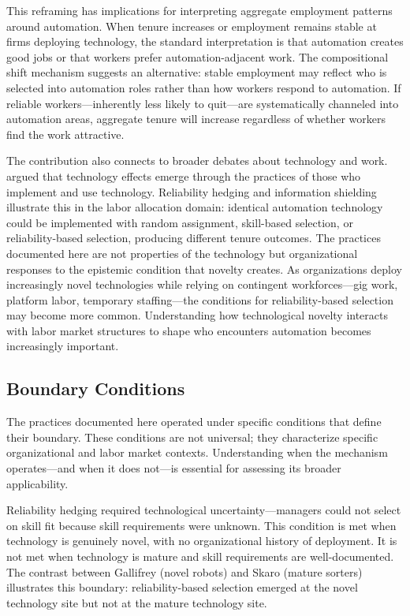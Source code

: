 \documentclass[12pt]{article}
\begin{document}
This reframing has implications for interpreting aggregate employment patterns around automation. When tenure increases or employment remains stable at firms deploying technology, the standard interpretation is that automation creates good jobs or that workers prefer automation-adjacent work. The compositional shift mechanism suggests an alternative: stable employment may reflect who is selected into automation roles rather than how workers respond to automation. If reliable workers---inherently less likely to quit---are systematically channeled into automation areas, aggregate tenure will increase regardless of whether workers find the work attractive.

The contribution also connects to broader debates about technology and work. \citet{orlikowski2000using} argued that technology effects emerge through the practices of those who implement and use technology. Reliability hedging and information shielding illustrate this in the labor allocation domain: identical automation technology could be implemented with random assignment, skill-based selection, or reliability-based selection, producing different tenure outcomes. The practices documented here are not properties of the technology but organizational responses to the epistemic condition that novelty creates. As organizations deploy increasingly novel technologies while relying on contingent workforces---gig work, platform labor, temporary staffing---the conditions for reliability-based selection may become more common. Understanding how technological novelty interacts with labor market structures to shape who encounters automation becomes increasingly important.

\subsection{Boundary Conditions}

The practices documented here operated under specific conditions that define their boundary. These conditions are not universal; they characterize specific organizational and labor market contexts. Understanding when the mechanism operates---and when it does not---is essential for assessing its broader applicability.

Reliability hedging required technological uncertainty---managers could not select on skill fit because skill requirements were unknown. This condition is met when technology is genuinely novel, with no organizational history of deployment. It is not met when technology is mature and skill requirements are well-documented. The contrast between Gallifrey (novel robots) and Skaro (mature sorters) illustrates this boundary: reliability-based selection emerged at the novel technology site but not at the mature technology site.
\end{document}
